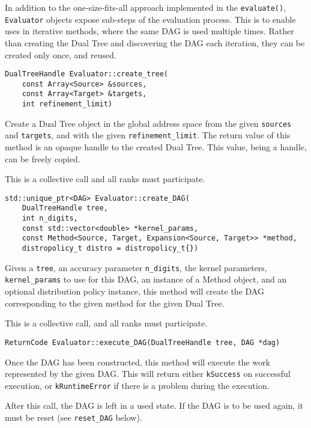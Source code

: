In addition to the one-size-fits-all approach implemented in the
\texttt{evaluate()}, \texttt{Evaluator} objects expose sub-steps of the
evaluation process. This is to enable uses in iterative methods, where the
same DAG is used multiple times. Rather than creating the Dual Tree and
discovering the DAG each iteration, they can be created only once, and
reused.

\begin{lstlisting}
DualTreeHandle Evaluator::create_tree(
    const Array<Source> &sources,
    const Array<Target> &targets,
    int refinement_limit)
\end{lstlisting}

\noindent Create a Dual Tree object in the global address space from the
given \texttt{sources} and \texttt{targets}, and with the given
\texttt{refinement\_limit}. The return value of this method is an opaque
handle to the created Dual Tree. This value, being a handle, can be freely
copied.

This is a collective call and all ranks must participate.

\begin{lstlisting}
std::unique_ptr<DAG> Evaluator::create_DAG(
    DualTreeHandle tree,
    int n_digits,
    const std::vector<double> *kernel_params,
    const Method<Source, Target, Expansion<Source, Target>> *method,
    distropolicy_t distro = distropolicy_t{})
\end{lstlisting}

\noindent Given a \texttt{tree}, an accuracy parameter \texttt{n\_digits},
the kernel
parameters, \texttt{kernel\_params} to use for this DAG, an instance of a
Method object, and an optional distribution policy instance, this method will
create the DAG corresponding to the given method for the given Dual Tree.

This is a collective call, and all ranks must participate.

\begin{lstlisting}
ReturnCode Evaluator::execute_DAG(DualTreeHandle tree, DAG *dag)
\end{lstlisting}

\noindent Once the DAG has been constructed, this method will execute the work
represented by the given DAG. This will return either \texttt{kSuccess} on
successful execution, or \texttt{kRuntimeError} if there is a problem during
the execution.

After this call, the DAG is left in a used state. If the DAG is to be used
again, it must be reset (see \texttt{reset\_DAG} below).

